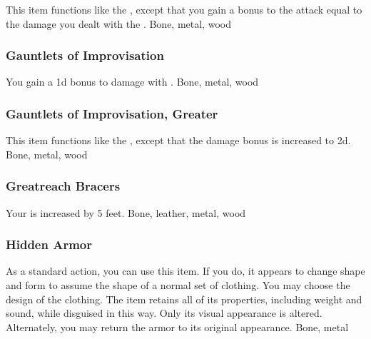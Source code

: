 This item functions like the , except that you gain a bonus to the  attack equal to the damage you dealt with the .
 
 Bone, metal, wood
\lowercase{\hypertarget{item:Gauntlets of Improvisation}{}}\label{item:Gauntlets of Improvisation}
\hypertarget{item:Gauntlets of Improvisation}{\subsubsection{Gauntlets of Improvisation\hfill{}}}
You gain a \plus1d bonus to damage with .
 
 Bone, metal, wood
\lowercase{\hypertarget{item:Gauntlets of Improvisation, Greater}{}}\label{item:Gauntlets of Improvisation, Greater}
\hypertarget{item:Gauntlets of Improvisation, Greater}{\subsubsection{Gauntlets of Improvisation, Greater\hfill{}}}
This item functions like the , except that the damage bonus is increased to \plus2d.
 
 Bone, metal, wood
\lowercase{\hypertarget{item:Greatreach Bracers}{}}\label{item:Greatreach Bracers}
\hypertarget{item:Greatreach Bracers}{\subsubsection{Greatreach Bracers\hfill{}}}
Your  is increased by 5 feet.
 
 Bone, leather, metal, wood
\lowercase{\hypertarget{item:Hidden Armor}{}}\label{item:Hidden Armor}
\hypertarget{item:Hidden Armor}{\subsubsection{Hidden Armor\hfill{}}}
As a standard action, you can use this item.
If you do, it appears to change shape and form to assume the shape of a normal set of clothing.
You may choose the design of the clothing.
The item retains all of its properties, including weight and sound, while disguised in this way.
Only its visual appearance is altered.
Alternately, you may return the armor to its original appearance.
 
 Bone, metal
\lowercase{\hypertarget{item:Mask of Air}{}}\label{item:Mask of Air}
